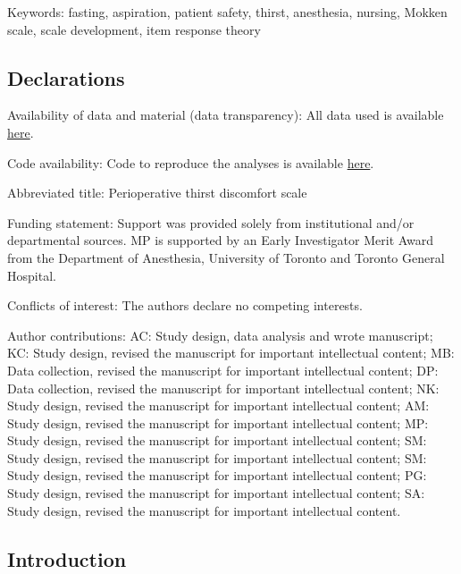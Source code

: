 \documentclass[letterpaper,9pt,twocolumn,twoside,]{pinp}
\begin{document}
Keywords: fasting, aspiration, patient safety, thirst, anesthesia,
nursing, Mokken scale, scale development, item response theory

\hypertarget{declarations}{%
\subsection{Declarations}\label{declarations}}

Availability of data and material (data transparency): All data used is
available \href{https://github.com/awconway/ptds}{here}.

Code availability: Code to reproduce the analyses is available
\href{https://github.com/awconway/ptds}{here}.

Abbreviated title: Perioperative thirst discomfort scale

Funding statement: Support was provided solely from institutional and/or
departmental sources. MP is supported by an Early Investigator Merit
Award from the Department of Anesthesia, University of Toronto and
Toronto General Hospital.

Conflicts of interest: The authors declare no competing interests.

Author contributions: AC: Study design, data analysis and wrote
manuscript; KC: Study design, revised the manuscript for important
intellectual content; MB: Data collection, revised the manuscript for
important intellectual content; DP: Data collection, revised the
manuscript for important intellectual content; NK: Study design, revised
the manuscript for important intellectual content; AM: Study design,
revised the manuscript for important intellectual content; MP: Study
design, revised the manuscript for important intellectual content; SM:
Study design, revised the manuscript for important intellectual content;
SM: Study design, revised the manuscript for important intellectual
content; PG: Study design, revised the manuscript for important
intellectual content; SA: Study design, revised the manuscript for
important intellectual content.

\hypertarget{introduction-1}{%
\subsection{Introduction}\label{introduction-1}}
\end{document}
